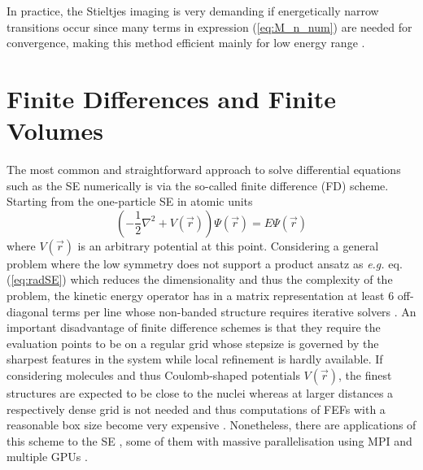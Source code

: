 In practice, the Stieltjes imaging is very demanding if energetically narrow transitions occur since many terms in expression (\ref{eq:M_n_num}) are needed for convergence, making this method efficient mainly for low energy range \cite{H2pDeCleva}.

\section{Finite Differences and Finite Volumes}
\label{ch:FD}
The most common and straightforward approach to solve differential equations such as the SE numerically is via the so-called finite difference (FD) scheme.
Starting from the one-particle SE in atomic units
\begin{equation} 
\left(-\frac 12 \nabla^2 + V(\vec{r}) \right) \Psi(\vec{r})=E\Psi(\vec{r})
\end{equation}
where $V(\vec{r})$ is an arbitrary potential at this point.
Considering a general problem where the low symmetry does not support a product ansatz as \textit{e.g.} eq. (\ref{eq:radSE}) which reduces the dimensionality and thus the complexity of the problem, the kinetic energy operator has in a matrix representation at least $6$ off-diagonal terms per line whose non-banded structure requires iterative solvers \cite{fd_Cart}.
An important disadvantage of finite difference schemes is that they require the evaluation points to be on a regular grid whose stepsize is governed by the sharpest features in the system while local refinement is hardly available.
If considering molecules and thus Coulomb-shaped potentials $V(\vec{r})$, the finest structures are expected to be close to the nuclei whereas at larger distances a respectively dense grid is not needed and thus computations of FEFs with a reasonable box size become very expensive \cite{richardsFD}.
Nonetheless, there are applications of this scheme to the SE \cite{fd_Cart,fd_Cart2}, some of them with massive parallelisation using MPI and multiple GPUs \cite{fd_gpu}.

